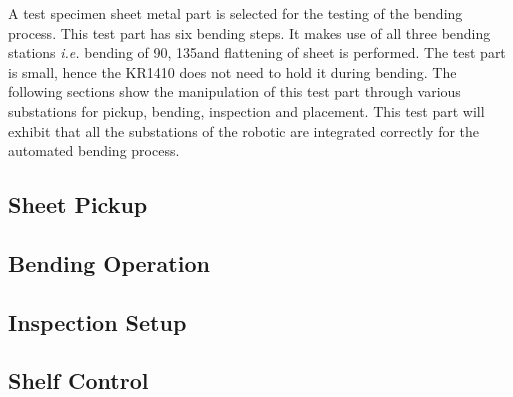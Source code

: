 A test specimen sheet metal part is selected for the testing of the bending process. This test part has six bending steps. It makes use of all three bending stations \textit{i.e.} bending of 90\textdegree, 135\textdegree and flattening of sheet is performed. The test part is small, hence the KR1410 does not need to hold it during bending. The following sections show the manipulation of this test part through various substations for pickup, bending, inspection and placement. This test part will exhibit that all the substations of the robotic are integrated correctly for the automated bending process.

\subsection{Sheet Pickup}
\label{subsec:sheet-pickup}

\FloatBarrier  %

\subsection{Bending Operation}
\label{subsec:bending-operation}

\FloatBarrier  %

\subsection{Inspection Setup}
\label{subsec:inspection}

\FloatBarrier  %

\subsection{Shelf Control}
\label{subsec:shelf-control}

\FloatBarrier  %
